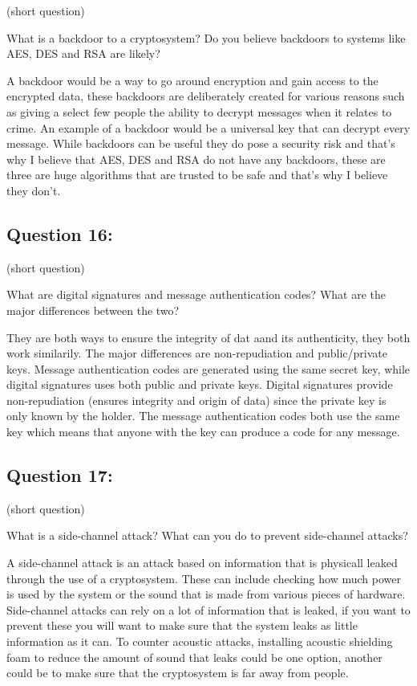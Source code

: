 \documentclass[11pt]{article}
\begin{document}
(short question)

What is a backdoor to a cryptosystem? Do you believe backdoors to
systems like AES, DES and RSA are likely?

    A backdoor would be a way to go around encryption and gain access to the
encrypted data, these backdoors are deliberately created for various
reasons such as giving a select few people the ability to decrypt
messages when it relates to crime. An example of a backdoor would be a
universal key that can decrypt every message. While backdoors can be
useful they do pose a security risk and that's why I believe that AES,
DES and RSA do not have any backdoors, these are three are huge
algorithms that are trusted to be safe and that's why I believe they
don't.

    \hypertarget{question-16}{%
\subsection{Question 16:}\label{question-16}}

(short question)

What are digital signatures and message authentication codes? What are
the major differences between the two?

    They are both ways to ensure the integrity of dat aand its authenticity,
they both work similarily. The major differences are non-repudiation and
public/private keys. Message authentication codes are generated using
the same secret key, while digital signatures uses both public and
private keys. Digital signatures provide non-repudiation (ensures
integrity and origin of data) since the private key is only known by the
holder. The message authentication codes both use the same key which
means that anyone with the key can produce a code for any message.

    \hypertarget{question-17}{%
\subsection{Question 17:}\label{question-17}}

(short question)

What is a side-channel attack? What can you do to prevent side-channel
attacks?

    A side-channel attack is an attack based on information that is
physicall leaked through the use of a cryptosystem. These can include
checking how much power is used by the system or the sound that is made
from various pieces of hardware. Side-channel attacks can rely on a lot
of information that is leaked, if you want to prevent these you will
want to make sure that the system leaks as little information as it can.
To counter acoustic attacks, installing acoustic shielding foam to
reduce the amount of sound that leaks could be one option, another could
be to make sure that the cryptosystem is far away from people.
\end{document}
